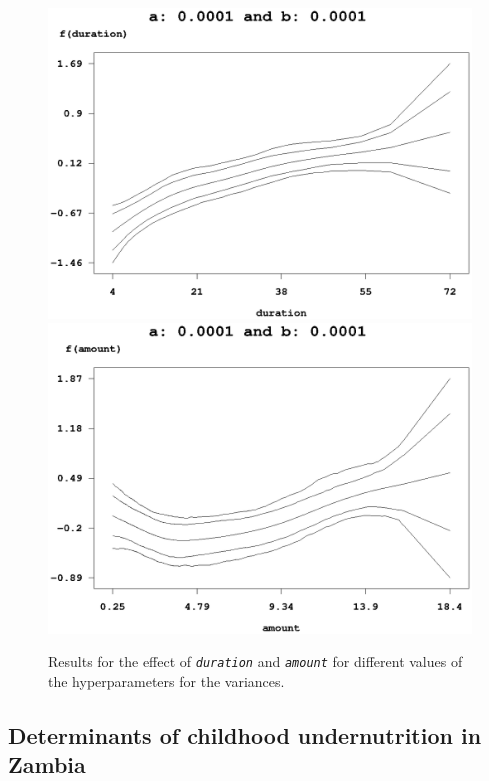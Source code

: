 \begin{figure}[ht]
\begin{center}
\vspace{0.5cm}
\includegraphics[scale=0.4]{grafiken/credit_duration_a0001b0001.ps} \hspace{0.3cm}
\includegraphics[scale=0.4]{grafiken/credit_amount_a0001b0001.ps}
\end{center}
{\em\caption{ \label{credit_varhyper} Results for the effect of
{\em\tt duration} and {\em\tt amount} for different values of the
hyperparameters for the variances.}}
\end{figure}


\clearpage

\subsection{Determinants of childhood undernutrition in Zambia}

